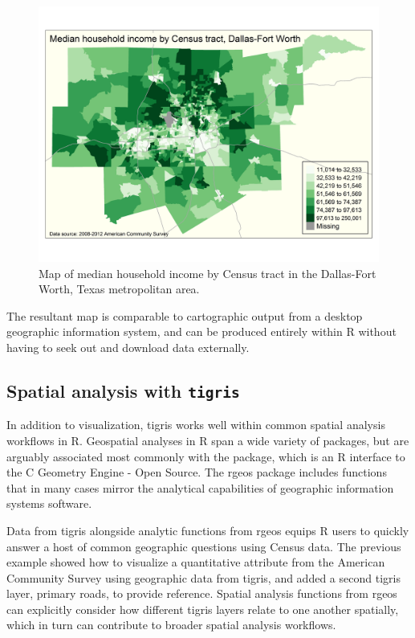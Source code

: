 \begin{figure}[htbp]
  \centering
  \includegraphics[width=\textwidth]{income_map}
  \caption{Map of median household income by Census tract in the Dallas-Fort Worth, Texas metropolitan area.}
  \label{figure:income_map}
\end{figure}

The resultant map is comparable to cartographic output from a desktop
geographic information system, and can be produced entirely within R
without having to seek out and download data externally.

\subsection{\texorpdfstring{Spatial analysis with
\texttt{tigris}}{Spatial analysis with tigris}}\label{spatial-analysis-with-tigris}

In addition to visualization, tigris works well within common spatial
analysis workflows in R. Geospatial analyses in R span a wide variety of
packages, but are arguably associated most commonly with the
 package, which is an R interface to the C Geometry
Engine - Open Source. The rgeos package includes functions that in many
cases mirror the analytical capabilities of geographic information
systems software.

Data from tigris alongside analytic functions from rgeos equips R users
to quickly answer a host of common geographic questions using Census
data. The previous example showed how to visualize a quantitative
attribute from the American Community Survey using geographic data from
tigris, and added a second tigris layer, primary roads, to provide
reference. Spatial analysis functions from rgeos can explicitly consider
how different tigris layers relate to one another spatially, which in
turn can contribute to broader spatial analysis workflows.

